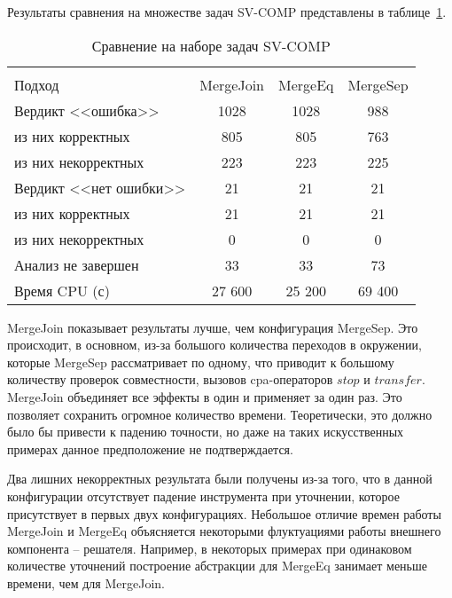 Результаты сравнения на множестве задач SV-COMP представлены в таблице~\ref{table-sv-comp-merge}.

  \begin{table}[h]\footnotesize \centering
    \caption{Сравнение на наборе задач SV-COMP}
  	\label{table-sv-comp-merge}
    \begin{tabular}{ | l | c | c | c | }
      \hline
      		& 		\multicolumn{3}{c|}{\theory}  \\
      Подход         				& MergeJoin & MergeEq 	& MergeSep   \\ \hline
      Вердикт <<ошибка>> 				& 1028    	& 1028		& 988         \\ 
  \hspace{0.5cm} из них корректных 	& 805 		& 805 		& 763      \\ 
  \hspace{0.5cm} из них некорректных & 223 		& 223 		& 225        \\ \hline
      Вердикт <<нет ошибки>>  		& 21      	& 21        & 21       \\ 
  \hspace{0.5cm} из них корректных 	& 21 		& 21    	& 21        \\
  \hspace{0.5cm} из них некорректных & 0 		& 0    		& 0         \\ \hline
      Анализ не завершен       		& 33     	& 33        & 73       \\ \hline
      Время CPU (с)   				& 27 600 	& 25 200    & 69 400    \\ 
      \hline
    \end{tabular}
  \end{table}

MergeJoin показывает результаты лучше, чем конфигурация MergeSep.
Это происходит, в основном, из-за большого количества переходов в окружении, которые MergeSep рассматривает по одному, что приводит к большому количеству проверок совместности, вызовов cpa-операторов $stop$ и $transfer$.
MergeJoin объединяет все эффекты в один и применяет за один раз. Это позволяет сохранить огромное количество времени. Теоретически, это должно было бы привести к падению точности, но даже на таких искусственных примерах данное предположение не подтверждается.

Два лишних некорректных результата были получены из-за того, что в данной конфигурации отсутствует падение инструмента при уточнении, которое присутствует в первых двух конфигурациях.
Небольшое отличие времен работы MergeJoin и MergeEq объясняется некоторыми флуктуациями работы внешнего компонента -- решателя. 
Например, в некоторых примерах при одинаковом количестве уточнений построение абстракции для MergeEq занимает меньше времени, чем для MergeJoin.

